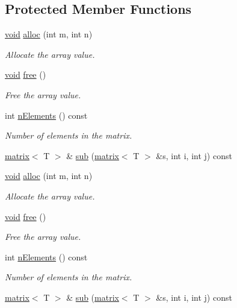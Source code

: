 \subsection*{Protected Member Functions}
\begin{DoxyCompactItemize}
\item 
\hyperlink{png_8h_aa8c59027f9ab2769342f248709d68d17}{void} \hyperlink{classlibNumerics_1_1matrix_aa2fa7e4f85820dc854c52fcd65359683}{alloc} (int m, int n)
\begin{DoxyCompactList}\small\item\em Allocate the array value. \end{DoxyCompactList}\item 
\hyperlink{png_8h_aa8c59027f9ab2769342f248709d68d17}{void} \hyperlink{classlibNumerics_1_1matrix_a8834c792b39414596e43977d01ffe608}{free} ()
\begin{DoxyCompactList}\small\item\em Free the array value. \end{DoxyCompactList}\item 
int \hyperlink{classlibNumerics_1_1matrix_a2149f81bae93466889943912739988fb}{n\+Elements} () const 
\begin{DoxyCompactList}\small\item\em Number of elements in the matrix. \end{DoxyCompactList}\item 
\hyperlink{classlibNumerics_1_1matrix}{matrix}$<$ T $>$ \& \hyperlink{classlibNumerics_1_1matrix_a43319acc6c9d6e6c37c3bc47cf1a5dd8}{sub} (\hyperlink{classlibNumerics_1_1matrix}{matrix}$<$ T $>$ \&s, int i, int j) const 
\item 
\hyperlink{png_8h_aa8c59027f9ab2769342f248709d68d17}{void} \hyperlink{classlibNumerics_1_1matrix_aa2fa7e4f85820dc854c52fcd65359683}{alloc} (int m, int n)
\begin{DoxyCompactList}\small\item\em Allocate the array value. \end{DoxyCompactList}\item 
\hyperlink{png_8h_aa8c59027f9ab2769342f248709d68d17}{void} \hyperlink{classlibNumerics_1_1matrix_a8834c792b39414596e43977d01ffe608}{free} ()
\begin{DoxyCompactList}\small\item\em Free the array value. \end{DoxyCompactList}\item 
int \hyperlink{classlibNumerics_1_1matrix_a2149f81bae93466889943912739988fb}{n\+Elements} () const 
\begin{DoxyCompactList}\small\item\em Number of elements in the matrix. \end{DoxyCompactList}\item 
\hyperlink{classlibNumerics_1_1matrix}{matrix}$<$ T $>$ \& \hyperlink{classlibNumerics_1_1matrix_a43319acc6c9d6e6c37c3bc47cf1a5dd8}{sub} (\hyperlink{classlibNumerics_1_1matrix}{matrix}$<$ T $>$ \&s, int i, int j) const 
\end{DoxyCompactItemize}
